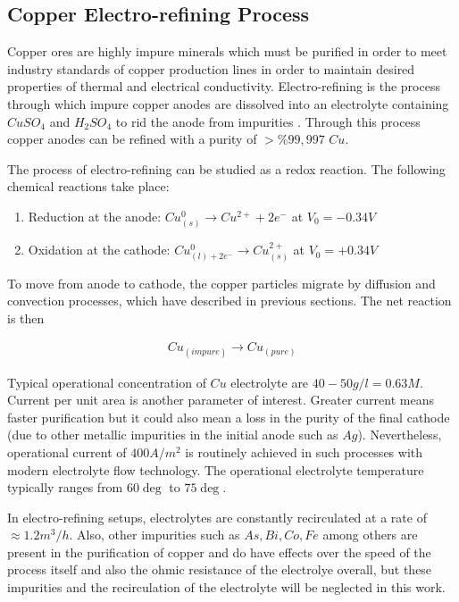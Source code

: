\subsection{Copper Electro-refining Process}

Copper ores are highly impure minerals which must be purified in order to meet industry standards of copper production lines in order to maintain desired properties of thermal and electrical conductivity. Electro-refining is the process through which impure copper anodes are dissolved into an electrolyte containing $CuSO_4$ and $H_2SO_4$ to rid the anode from impurities \cite{schlesinger}. Through this process copper anodes can be refined with a purity of $>\%99,997$ $Cu$.


The process of electro-refining can be studied as a redox reaction. The following chemical reactions take place:
\begin{enumerate}
	\item Reduction at the anode: $Cu^0_{(s)} \rightarrow Cu^{2+} + 2e^-$ at $V_0 = -0.34V$
	\item Oxidation at the cathode: $Cu^0_{(l) + 2e^-} \rightarrow Cu^{2+}_{(s)} $ at $V_0 = +0.34V$
\end{enumerate}

To move from anode to cathode, the copper particles migrate by diffusion and convection processes, which have described in previous sections. The net reaction is then

\begin{align}
	Cu_{(impure)} \rightarrow Cu_{(pure)}
\end{align}

Typical operational concentration of $Cu$ electrolyte are $40-50 g/l = 0.63 M$\cite{schlesinger}. Current per unit area is another parameter of interest. Greater current means faster purification but it could also mean a loss in the purity of the final cathode (due to other metallic impurities in the initial anode such as $Ag$). Nevertheless, operational current of $400 A/m^2$ is routinely achieved in such processes with modern electrolyte flow technology. The operational electrolyte temperature typically ranges from $60\deg$ to $75\deg$.

In electro-refining setups, electrolytes are constantly recirculated at a rate of $\approx 1.2 m^3/h$. Also, other impurities such as $As, Bi, Co, Fe$ among others are present in the purification of copper and do have effects over the speed of the process itself and also the ohmic resistance of the electrolye overall, but these impurities and the recirculation of the electrolyte will be neglected in this work. 



